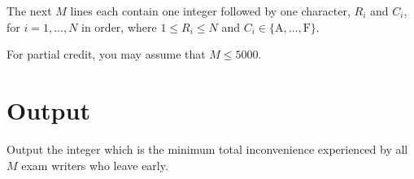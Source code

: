 The next $M$ lines each contain one integer followed by one character, $R_i$ and $C_i$, for $i =
1, \ldots, N$ in order, where $1 \leq R_i \leq N$ and $C_i \in \{\text{A}, \ldots, \text{F}\}$.

For partial credit, you may assume that $M \leq 5000$.

\section*{Output}
Output the integer which is the minimum total inconvenience experienced by all $M$ exam writers who
leave early.

